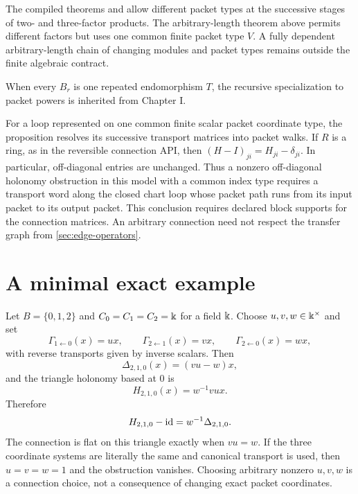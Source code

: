 \begin{boundary}
The compiled theorems
 and
 allow different packet
types at the successive stages of two- and three-factor products.  The
arbitrary-length theorem above permits different factors but uses one common
finite packet type $V$.  A fully dependent arbitrary-length chain of changing
modules and packet types remains outside the finite algebraic contract.
\end{boundary}

\begin{remark}
When every $B_r$ is one repeated endomorphism $T$, the recursive
specialization to packet powers is inherited from Chapter I.
\end{remark}

For a loop represented on one common finite scalar packet coordinate type,
the proposition resolves its successive transport matrices into packet
walks.  If $R$ is a ring, as in the reversible connection API, then
$(H-I)_{ji}=H_{ji}-\delta_{ji}$.  In particular, off-diagonal entries are
unchanged.  Thus a nonzero off-diagonal holonomy obstruction in this model
with a common index type requires a transport word along the closed chart
loop whose packet path runs from its input packet to its output packet.  This
conclusion requires declared block supports for the connection matrices.
An arbitrary connection need not respect the transfer graph from
\cref{sec:edge-operators}.

\section{A minimal exact example}
\label{sec:example}

\begin{example}
Let $B=\{0,1,2\}$ and $C_0=C_1=C_2=\Bbbk$ for a field $\Bbbk$.  Choose
$u,v,w\in\Bbbk^\times$ and set
\[
\Gamma_{1\leftarrow0}(x)=ux,\qquad
\Gamma_{2\leftarrow1}(x)=vx,\qquad
\Gamma_{2\leftarrow0}(x)=wx,
\]
with reverse transports given by inverse scalars.  Then
\[
\Delta_{2,1,0}(x)=(vu-w)x,
\]
and the triangle holonomy based at $0$ is
\[
H_{2,1,0}(x)=w^{-1}vux.
\]
Therefore
\[
H_{2,1,0}-\operatorname{id}
=w^{-1}\Delta_{2,1,0}.
\]
The connection is flat on this triangle exactly when $vu=w$.  If the three
coordinate systems are literally the same and canonical transport is used,
then $u=v=w=1$ and the obstruction vanishes.  Choosing arbitrary nonzero
$u,v,w$ is a connection choice, not a consequence of changing exact packet
coordinates.
\end{example}

